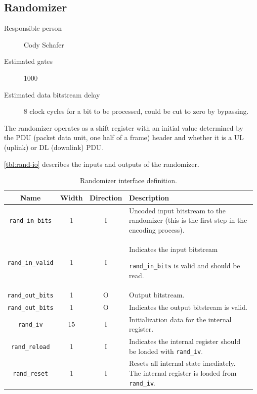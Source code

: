 \documentclass[dvips,10pt,twocolumn]{article}
\begin{document}

\subsection{Randomizer}
\label{sec:rand}
\begin{description}
	\item[Responsible person] Cody Schafer 
	\item[Estimated gates] 1000
	\item[Estimated data bitstream delay] 8 clock cycles for a bit to be
		processed, could be cut to zero by bypassing.
\end{description}

The randomizer operates as a shift register with an initial value
determined by the PDU (packet data unit, one half of a frame) header
and whether it is a UL (uplink) or DL (downlink) PDU.

\autoref{tbl:rand-io} describes the inputs and outputs of the
randomizer.

\begin{table} \begin{tabularx}{\textwidth}{c|c|c|X}
	\label{tbl:rand-io}
	Name & Width & Direction & Description \\ \hline

	\texttt{rand\_in\_bits}  & 1  & I & Uncoded input bitstream to the
	randomizer (this is the first step in the encoding process).\\

	\texttt{rand\_in\_valid} & 1  & I & Indicates the input bitstream

	\texttt{rand\_in\_bits} is valid and should be read. \\

	\texttt{rand\_out\_bits} & 1  & O & Output bitstream. \\
	
	\texttt{rand\_out\_bits} & 1  & O & Indicates the output bitstream
	is valid. \\

	\texttt{rand\_iv}        & 15 & I & Initialization data for the
	internal register. \\

	\texttt{rand\_reload}    & 1  & I & Indicates the internal
	register should be loaded with \texttt{rand\_iv}. \\

	\texttt{rand\_reset}     & 1  & I & Resets all internal state
	imediately. The internal register is loaded from
	\texttt{rand\_iv}.

\end{tabularx}
\caption{Randomizer interface definition.}
\end{table}
	
\end{document}
